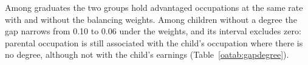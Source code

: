 Among graduates the two groups hold advantaged occupations at the same rate with and without the balancing weights. Among children without a degree the gap narrows from 0.10 to 0.06 under the weights, and its interval excludes zero: parental occupation is still associated with the child's occupation where there is no degree, although not with the child's earnings (Table~\ref{oatab:gapdegree}).%
